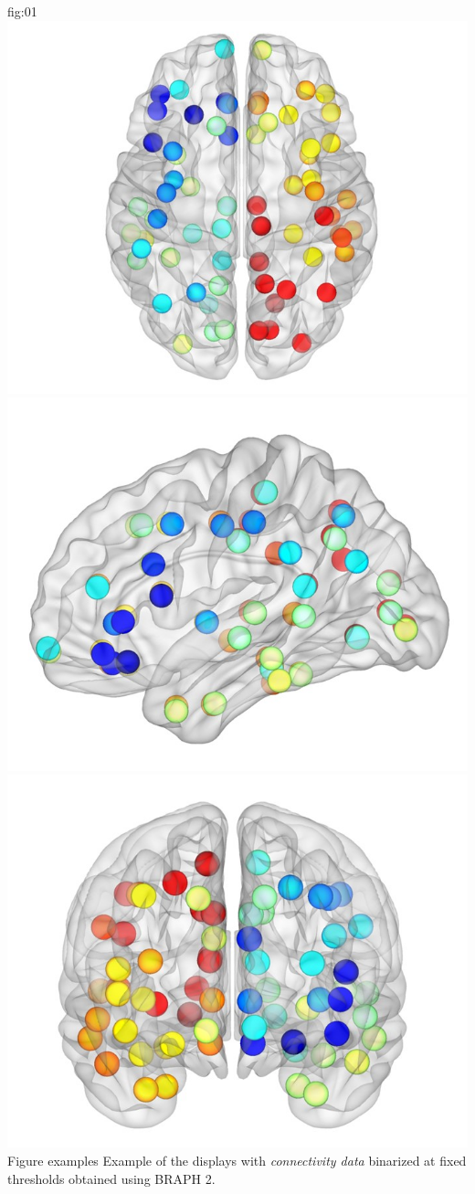 \documentclass[justified]{tufte-handout}
\begin{document}
	{fig:01}
	{
	\includegraphics{fig01_01.jpg}
	\includegraphics{fig01_02.jpg}
	\includegraphics{fig01_03.jpg}
	}
	{Figure examples}
	{
	Example of the displays  with \emph{connectivity data} binarized at fixed thresholds obtained using BRAPH 2.
	}
	
\end{document}
